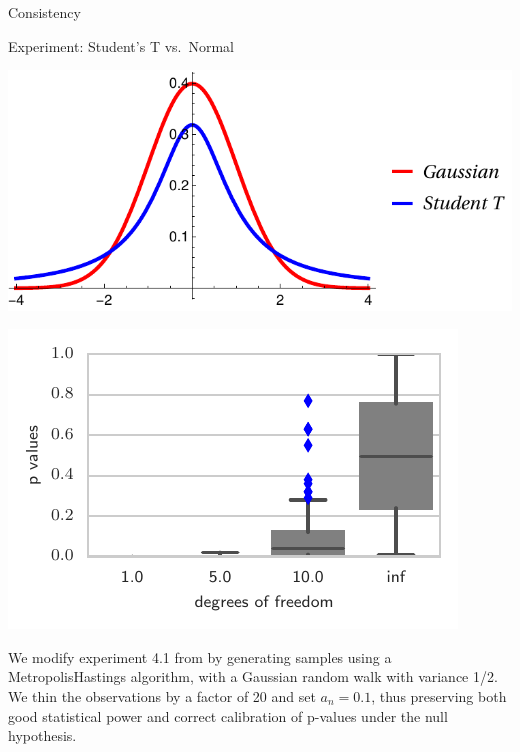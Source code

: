 \begin{frame}
\begin{columns}
\begin{column}{.32\linewidth}
\begin{block}{Consistency}
\end{block}


\vspace{-0.75cm}
\begin{block}{Experiment: Student's T vs.\ Normal}

\begin{center}
\begin{minipage}{.45\linewidth}
\includegraphics[width=\textwidth]{../../presentation/img/nt}
\end{minipage}
\begin{minipage}{.45\linewidth}
 \includegraphics[width=\textwidth]{../../presentation/img/sgld_student_opt} 
\end{minipage}
\end{center}



We modify experiment 4.1 from \cite{gorham2015measuring} by  generating samples using
a Metropolis\textendash Hastings algorithm, with a Gaussian random walk with variance 1/2. We thin the observations by a factor of 20 and
set $a_{n}=0.1$, thus preserving both good statistical power and
correct calibration of p-values under the null hypothesis.


\end{block}
\end{column}
\end{columns}
\end{frame}

